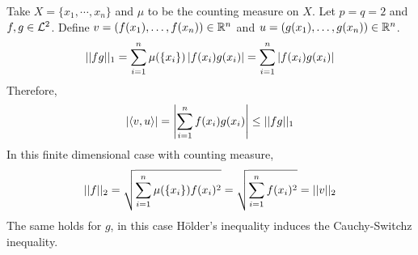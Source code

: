 \documentclass[11pt]{article}
\begin{document}
	\begin{example}
		Take $X = \{x_1,\cdots, x_n\}$ and $\mu$ to be the counting measure on $X$. Let $p = q = 2$ and $f, g \in \mathcal{{L}}^2$. Define $v = (f(x_1), \dots, f(x_n)) \in \mathbb{R}^n$ and $u = (g(x_1),\dots,g(x_n)) \in \mathbb{R}^n$.
		\begin{align}
			\vert \vert {fg} \vert \vert_1 = \sum_{i=1}^n \mu(\{x_i\}) \left \vert {f(x_i) g(x_i)} \right \vert = \sum_{i=1}^n \left \vert {f(x_i) g(x_i)} \right \vert
		\end{align}
		Therefore,
		\begin{align}
			\left \vert {\langle {v}, {u} \rangle} \right \vert = \left \vert {\sum_{i=1}^n f(x_i) g(x_i)} \right \vert \leq \vert \vert {fg} \vert \vert_1
		\end{align}
		In this finite dimensional case with counting measure,
		\begin{align}
			\vert \vert {f} \vert \vert_2 = \sqrt{\sum_{i=1}^n \mu(\{x_i\}) f(x_i)^2} = \sqrt{\sum_{i=1}^n f(x_i)^2} = \vert \vert {v} \vert \vert_2
		\end{align}
		The same holds for $g$, in this case H\"older's inequality induces the Cauchy-Switchz inequality.
	\end{example}
\end{document}
